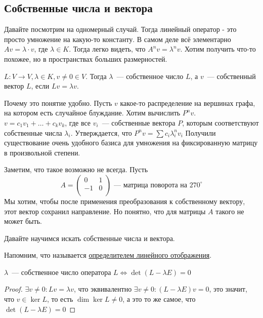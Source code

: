 \subsection{Собственные числа и вектора}
\begin{motivation}
    Давайте посмотрим на одномерный случай. Тогда линейный оператор - это просто умножение на какую-то константу. В самом деле всё элементарно $Av = \lambda\cdot v$, где $\lambda\in K$.
    Тогда легко видеть, что $A^nv = \lambda^n v$. Хотим получить что-то похожее, но в пространствах больших размерностей.
\end{motivation}
\begin{definition}
    $L\colon V\rightarrow V, \lambda\in K, v\not= 0\in V$. Тогда $\lambda$~--- собственное число $L$, а $v$~--- собственный вектор $L$,
    если $Lv = \lambda v$.
\end{definition}
\begin{motivation}
    Почему это понятие удобно. Пусть $v$ какое-то распределение на вершинах графа, на котором есть случайное блуждание.
    Хотим вычислить $P^n v$. $v = c_1v_1 + \dots + c_kv_k$, где все $v_i$~--- собственные вектора $P$, которым соответствуют собственные числа $\lambda_i$. Утверждается, что $P^n v = \sum c_i \lambda_i^n v_i$
    Получили существование очень удобного базиса для умножения на фиксированную матрицу в произвольной степени.
\end{motivation}
\begin{remark}
    Заметим, что такое возможно не всегда.
    Пусть 
    \[
    A = 
    \begin{pmatrix}
        0& 1\\
        -1&0\\
    \end{pmatrix}
    \text{~--- матрица поворота на~} 270^\circ 
    \]
    Мы хотим, чтобы после применения преобразования к собственному вектору, этот вектор сохранил направление.
    Но понятно, что для матрицы $A$ такого не может быть.
\end{remark}
\begin{motivation}
    Давайте научимся искать собственные числа и вектора.
\end{motivation}
\begin{remark}
    Напомним, что называется \hyperref[def:определитель отображения]{определителем линейного отображения}.
\end{remark}
\begin{statement}
    $\lambda$~--- собственное число оператора $L \Leftrightarrow \det(L - \lambda E) = 0$
\end{statement}
\begin{proof}
    $\exists v\not= 0\colon Lv = \lambda v$, что эквивалентно $\exists v\not=0\colon (L - \lambda E)v = 0$, это значит, что $v \in \ker L$, то есть $\dim \ker L \neq 0$, а это то же самое, что $\det(L - \lambda E) = 0$
\end{proof}

